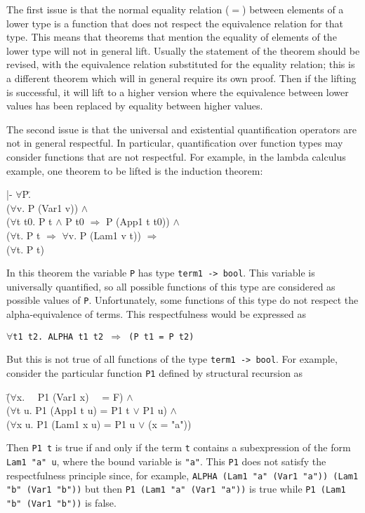 \documentclass[envcountsame,runningheads]{llncs}
\begin{document}
The first issue is that the normal equality relation ($=$) between elements
of a lower type is a function that does not respect the equivalence
relation for that type.  This means that theorems that mention the 
equality of elements of the lower type will not in general lift. 
Usually the statement of the theorem should be revised,
with the equivalence relation substituted for the equality relation;
this is a different theorem which will in general require its own proof.
Then if the lifting is successful, it will lift to
a higher version where the equivalence between lower values has been
replaced by equality between higher values.

The second issue is that the universal and existential quantification
operators
are not in general respectful.
In particular, quantification over function types
may consider functions that are not respectful.
For example, in the lambda calculus example, one theorem to be
lifted is the induction theorem:
{\tt \begin{tabbing}
\hspace{5.5mm}
    |- $\forall$P\=. \\
\>       ($\forall$v. P (Var1 v)) $\wedge$ \\
\>       ($\forall$t t0. P t $\wedge$ P t0 $\Rightarrow$ P (App1 t t0)) $\wedge$ \\
\>       ($\forall$t. P t $\Rightarrow$ $\forall$v. P (Lam1 v t)) $\Rightarrow$ \\
\>       ($\forall$t. P t)
\end{tabbing}}

In this theorem the variable {\tt P} has type {\tt term1 -> bool}.
This variable is universally quantified, so all possible functions of
this type are considered as possible values of {\tt P}.
Unfortunately, some functions of this type do not respect the
alpha-equivalence of terms.  This respectfulness would be expressed as
\begin{center}
{\tt $\forall$t1 t2. ALPHA t1 t2 $\Rightarrow$ (P t1 = P t2)}
\end{center}
But this is not true of all functions
of the type {\tt term1 -> bool}.
For example, consider the particular function {\tt P1} defined by
structural recursion as
{\tt \begin{tabbing}
\hspace{22.0mm}
       \=($\forall$x. \ \ P1 (Var1 x) \ \ = F) $\wedge$ \\
\>     ($\forall$t u. P1 (App1 t u) = P1 t $\vee$ P1 u) $\wedge$ \\
\>     ($\forall$x u. P1 (Lam1 x u) = P1 u $\vee$ (x = "a"))
\end{tabbing}}
Then {\tt P1 t} is true if and only if the term {\tt t} contains
a subexpression of the form {\tt Lam1 "a" u}, where the bound variable
is {\tt "a"}.  This {\tt P1} does not satisfy the respectfulness principle
since, for example, {\tt ALPHA (Lam1 "a" (Var1 "a")) (Lam1 "b" (Var1 "b"))}
but then {\tt P1 (Lam1 "a" (Var1 "a"))} is true while
{\tt P1~(Lam1 "b" (Var1 "b"))} is false.
\end{document}
